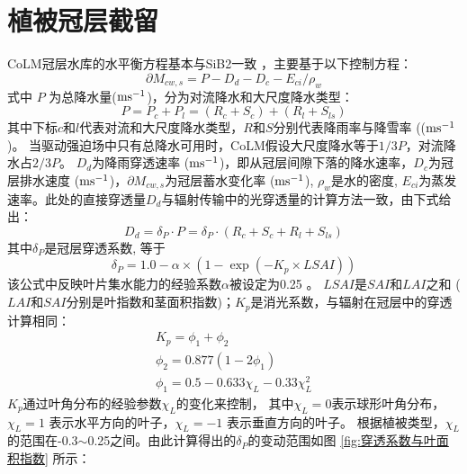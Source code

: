\section{植被冠层截留}\label{植被冠层截留}
CoLM冠层水库的水平衡方程基本与SiB2一致 \citet{sellers1996revised}，主要基于以下控制方程：
\begin{equation}
\partial M_{c w, s}=P-D_{d}-D_{c}-E_{c i} / \rho_{w}
\end{equation}
式中 $P$ 为总降水量($\rm m s^{-1}$)，分为对流降水和大尺度降水类型：
\begin{equation}
P=P_{c}+P_{l}=\left(R_{c}+S_{c}\right)+\left(R_{l}+S_{l s}\right)
\end{equation}
其中下标$c$和$l$代表对流和大尺度降水类型，$R$和$S$分别代表降雨率与降雪率 (($\rm m s^{-1}$)。
当驱动强迫场中只有总降水可用时，CoLM假设大尺度降水等于$1/3P$，对流降水占$2/3P$。
$D_d$为降雨穿透速率 ($\rm m s^{-1}$)，即从冠层间隙下落的降水速率，$D_c$为冠层排水速度 ($\rm m s^{-1}$)，$\partial M_{cw,s}$为冠层蓄水变化率 ($\rm m s^{-1}$), 
$\rho_w$是水的密度, $E_{ci}$为蒸发速率。此处的直接穿透量$D_d$与辐射传输中的光穿透量的计算方法一致，由下式给出：
\begin{equation}
D_{d}=\delta_{P} \cdot P=\delta_{P} \cdot\left(R_{c}+S_{c}+R_{l}+S_{l s}\right)
\end{equation}
其中$\delta_P$是冠层穿透系数, 等于
\begin{equation}
\delta_{P}=1.0-\alpha \times\left(1-\exp \left(-K_{p} \times LSAI\right)\right)
\end{equation}
该公式中反映叶片集水能力的经验系数$\alpha$被设定为0.25 \citep{lawrence2011parameterization}。
$LSAI$是$SAI$和$LAI$之和 ($LAI$和$SAI$分别是叶指数和茎面积指数)；$K_p$是消光系数，与辐射在冠层中的穿透计算相同：
\begin{equation}
\begin{array}{c}K_{p}=\phi_{1}+\phi_{2} \\ \phi_{2}=0.877\left(1-2 \phi_{1}\right) \\ \phi_{1}=0.5-0.633 \chi_{L}-0.33 \chi_{L}^{2}\end{array}
\end{equation}
$K_p$通过叶角分布的经验参数$\chi_L$的变化来控制，
其中$\chi_L=0$表示球形叶角分布，$\chi_L= 1$ 表示水平方向的叶子，$\chi_L= -1$ 表示垂直方向的叶子。
根据植被类型，$\chi_L$的范围在-0.3$\sim$0.25之间。由此计算得出的$\delta_P$的变动范围如图 \ref{fig:穿透系数与叶面积指数} 所示：
